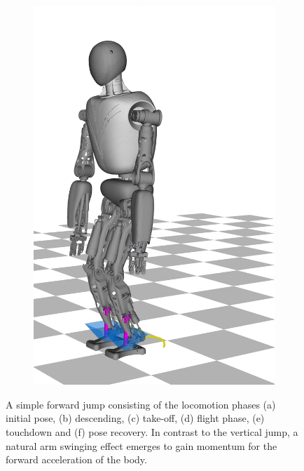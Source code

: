 \begin{figure}
\begin{subfigure}{.16\textwidth}
	\includegraphics[width=1\linewidth]{fig/jumpForward/snaps/6x}
	\caption{}
\end{subfigure}%
\caption[A simple forward jump]{A simple forward jump consisting of the locomotion phases (a) initial pose, (b) descending, (c) take-off, (d) flight phase, (e) touchdown and (f) pose recovery. In contrast to the vertical jump, a natural arm swinging effect emerges to gain momentum for the forward acceleration of the body.}
\label{fig:jumpForward_Snaps}
\end{figure} 

